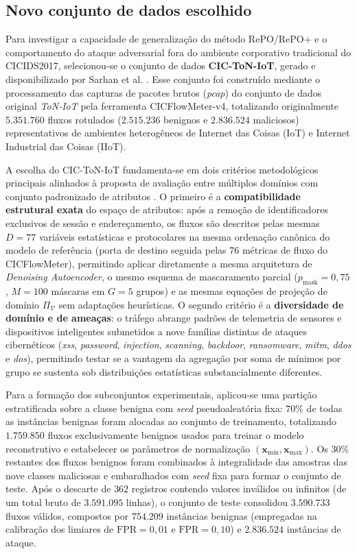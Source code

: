 \documentclass[conference]{IEEEtran}
\begin{document}
\subsection{Novo conjunto de dados escolhido}

Para investigar a capacidade de generalização do método RePO/RePO+ e o comportamento do ataque adversarial fora do ambiente corporativo tradicional do CICIDS2017, selecionou-se o conjunto de dados \textbf{CIC-ToN-IoT}, gerado e disponibilizado por Sarhan et al. \cite{sarhan2022cictoniot}.
Esse conjunto foi construído mediante o processamento das capturas de pacotes brutos (\textit{pcap}) do conjunto de dados original \textit{ToN-IoT} \cite{moustafa2019toniot} pela ferramenta CICFlowMeter-v4, totalizando originalmente $5.351.760$ fluxos rotulados ($2.515.236$ benignos e $2.836.524$ maliciosos) representativos de ambientes heterogêneos de Internet das Coisas (IoT) e Internet Industrial das Coisas (IIoT).

A escolha do CIC-ToN-IoT fundamenta-se em dois critérios metodológicos principais alinhados à proposta de avaliação entre múltiplos domínios com conjunto padronizado de atributos \cite{sarhan2022cictoniot}.
O primeiro é a \textbf{compatibilidade estrutural exata} do espaço de atributos: após a remoção de identificadores exclusivos de sessão e endereçamento, os fluxos são descritos pelas mesmas $D = 77$ variáveis estatísticas e protocolares na mesma ordenação canônica do modelo de referência (porta de destino seguida pelas $76$ métricas de fluxo do CICFlowMeter), permitindo aplicar diretamente a mesma arquitetura de \textit{Denoising Autoencoder}, o mesmo esquema de mascaramento parcial ($p_{\text{mask}} = 0{,}75$, $M = 100$ máscaras em $G = 5$ grupos) e as mesmas equações de projeção de domínio $\Pi_{\mathcal{V}}$ sem adaptações heurísticas.
O segundo critério é a \textbf{diversidade de domínio e de ameaças}: o tráfego abrange padrões de telemetria de sensores e dispositivos inteligentes submetidos a nove famílias distintas de ataques cibernéticos (\textit{xss}, \textit{password}, \textit{injection}, \textit{scanning}, \textit{backdoor}, \textit{ransomware}, \textit{mitm}, \textit{ddos} e \textit{dos}), permitindo testar se a vantagem da agregação por soma de mínimos por grupo se sustenta sob distribuições estatísticas substancialmente diferentes.

Para a formação dos subconjuntos experimentais, aplicou-se uma partição estratificada sobre a classe benigna com \textit{seed} pseudoaleatória fixa: $70\%$ de todas as instâncias benignas foram alocadas ao conjunto de treinamento, totalizando $1.759.850$ fluxos exclusivamente benignos usados para treinar o modelo reconstrutivo e estabelecer os parâmetros de normalização $(\mathbf{x}_{\min}, \mathbf{x}_{\max})$.
Os $30\%$ restantes dos fluxos benignos foram combinados à integralidade das amostras das nove classes maliciosas e embaralhados com \textit{seed} fixa para formar o conjunto de teste.
Após o descarte de $362$ registros contendo valores inválidos ou infinitos (de um total bruto de $3.591.095$ linhas), o conjunto de teste consolidou $3.590.733$ fluxos válidos, compostos por $754.209$ instâncias benignas (empregadas na calibração dos limiares de $\text{FPR} = 0{,}01$ e $\text{FPR} = 0{,}10$) e $2.836.524$ instâncias de ataque.
\end{document}
